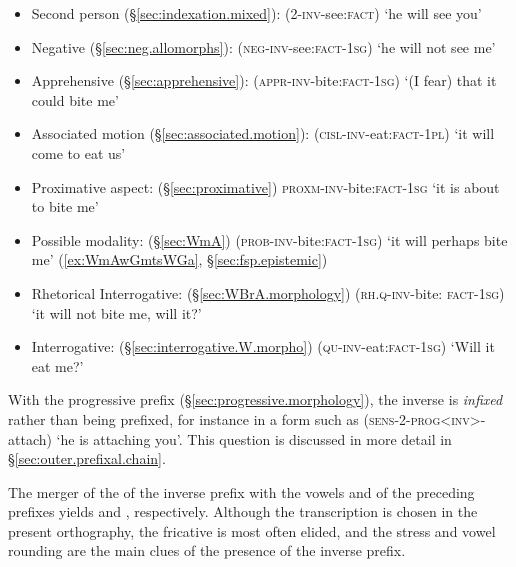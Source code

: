 \begin{itemize}
	\item Second person  (§\ref{sec:indexation.mixed}):  (2-\textsc{inv}-see:\textsc{fact}) `he will see you'
	\item Negative  (§\ref{sec:neg.allomorphs}):  (\textsc{neg}-\textsc{inv}-see:\textsc{fact}-\textsc{1sg}) `he will not see me'
	\item Apprehensive  (§\ref{sec:apprehensive}):  (\textsc{appr}-\textsc{inv}-bite:\textsc{fact}-\textsc{1sg}) `(I fear) that it could bite me'
	\item Associated motion  (§\ref{sec:associated.motion}):  (\textsc{cisl}-\textsc{inv}-eat:\textsc{fact}-\textsc{1pl}) `it will come to eat us'
	\item Proximative aspect:  (§\ref{sec:proximative})  \textsc{proxm}-\textsc{inv}-bite:\textsc{fact}-\textsc{1sg} `it is about to bite me'
	\item Possible modality:  (§\ref{sec:WmA})  (\textsc{prob}-\textsc{inv}-bite:\textsc{fact}-\textsc{1sg}) `it will perhaps bite me' (\ref{ex:WmAwGmtsWGa}, §\ref{sec:fsp.epistemic})
	\item Rhetorical Interrogative:  (§\ref{sec:WBrA.morphology})  (\textsc{rh}.\textsc{q}-\textsc{inv}-bite: \textsc{fact}-\textsc{1sg}) `it will not bite me, will it?'
	\item Interrogative:  (§\ref{sec:interrogative.W.morpho})  (\textsc{qu}-\textsc{inv}-eat:\textsc{fact}-\textsc{1sg}) `Will it eat me?'
\end{itemize}


With the progressive prefix  (§\ref{sec:progressive.morphology}), the inverse is \textit{infixed} rather than being prefixed, for instance in a form such as  (\textsc{sens}-2-\textsc{prog}<\textsc{inv}>-attach) `he is attaching you'. This question is discussed in more detail in §\ref{sec:outer.prefixal.chain}.

The merger of the  of the inverse prefix with the vowels  and  of the preceding prefixes yields  and , respectively.  Although the transcription  is chosen in the present orthography, the fricative  is most often elided, and the stress and vowel rounding are the main clues of the presence of the inverse prefix. 

